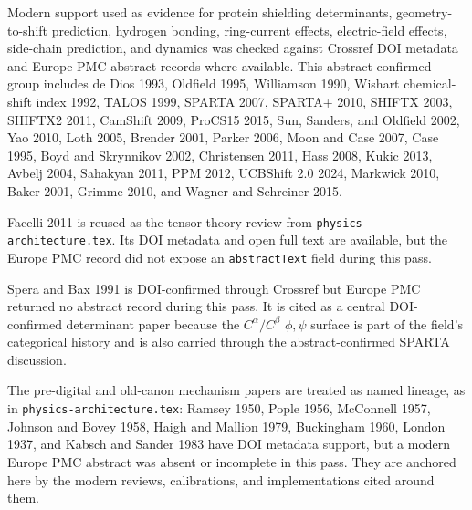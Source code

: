 \documentclass[11pt]{article}
\newcommand{\code}[1]{\texttt{#1}}
\begin{document}
Modern support used as evidence for protein shielding determinants,
geometry-to-shift prediction, hydrogen bonding, ring-current effects,
electric-field effects, side-chain prediction, and dynamics was checked against
Crossref DOI metadata and Europe PMC abstract records where available. This
abstract-confirmed group includes de Dios 1993, Oldfield 1995, Williamson 1990,
Wishart chemical-shift index 1992, TALOS 1999, SPARTA 2007, SPARTA+ 2010,
SHIFTX 2003, SHIFTX2 2011, CamShift 2009, ProCS15 2015, Sun, Sanders, and Oldfield 2002, Yao
2010, Loth 2005, Brender 2001, Parker 2006, Moon and Case 2007, Case 1995,
Boyd and Skrynnikov 2002, Christensen 2011, Hass 2008, Kukic 2013, Avbelj
2004, Sahakyan 2011, PPM 2012, UCBShift 2.0 2024, Markwick 2010, Baker 2001,
Grimme 2010, and Wagner and Schreiner 2015.

Facelli 2011 is reused as the tensor-theory review from
\code{physics-architecture.tex}. Its DOI metadata and open full text are
available, but the Europe PMC record did not expose an \code{abstractText}
field during this pass.

Spera and Bax 1991 is DOI-confirmed through Crossref but Europe PMC returned no
abstract record during this pass. It is cited as a central DOI-confirmed
determinant paper because the \(C^\alpha/C^\beta\) \(\phi,\psi\) surface is
part of the field's categorical history and is also carried through the
abstract-confirmed SPARTA discussion.

The pre-digital and old-canon mechanism papers are treated as named lineage,
as in \code{physics-architecture.tex}: Ramsey 1950, Pople 1956, McConnell
1957, Johnson and Bovey 1958, Haigh and Mallion 1979, Buckingham 1960, London
1937, and Kabsch and Sander 1983 have DOI metadata support, but a modern Europe
PMC abstract was absent or incomplete in this pass. They are anchored here by
the modern reviews, calibrations, and implementations cited around them.
\end{document}

